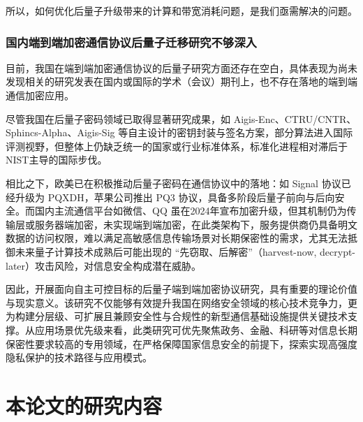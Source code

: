 所以，如何优化后量子升级带来的计算和带宽消耗问题，是我们亟需解决的问题。


\subsubsection{ 国内端到端加密通信协议后量子迁移研究不够深入}

目前，我国在端到端加密通信协议的后量子研究方面还存在空白，具体表现为尚未发现相关的研究发表在国内或国际的学术（会议）期刊上，也不存在落地的端到端通信加密应用。

尽管我国在后量子密码领域已取得显著研究成果，如 Aigis-Enc\cite{Shen2021AigisEnc}、CTRU/CNTR\cite{Zheng2024NTRU}、Sphincs-Alpha\cite{zhang2022sphincs}、Aigis-Sig\cite{PQMagic} 等自主设计的密钥封装与签名方案，部分算法进入国际评测视野，但整体上仍缺乏统一的国家或行业标准体系，标准化进程相对滞后于NIST主导的国际步伐。

相比之下，欧美已在积极推动后量子密码在通信协议中的落地：如 Signal 协议已经升级为 PQXDH，苹果公司推出 PQ3 协议，具备多阶段后量子前向与后向安全。而国内主流通信平台如微信、QQ 虽在2024年宣布加密升级，但其机制仍为传输层或服务器端加密，未实现端到端加密，在此类架构下，服务提供商仍具备明文数据的访问权限，难以满足高敏感信息传输场景对长期保密性的需求，尤其无法抵御未来量子计算技术成熟后可能出现的 “先窃取、后解密”（harvest-now, decrypt-later）攻击风险，对信息安全构成潜在威胁。

因此，开展面向自主可控目标的后量子端到端加密协议研究，具有重要的理论价值与现实意义。该研究不仅能够有效提升我国在网络安全领域的核心技术竞争力，更为构建分层级、可扩展且兼顾安全性与合规性的新型通信基础设施提供关键技术支撑。从应用场景优先级来看，此类研究可优先聚焦政务、金融、科研等对信息长期保密性要求较高的专用领域，在严格保障国家信息安全的前提下，探索实现高强度隐私保护的技术路径与应用模式。








\section{本论文的研究内容}


